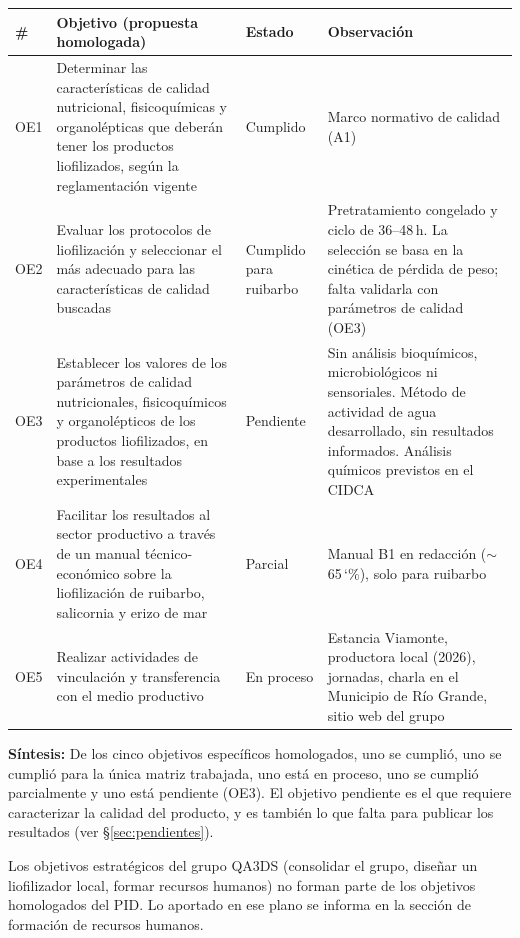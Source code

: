 \documentclass[12pt, a4paper]{article}
\newcommand{\pct}{\char`\%}
\begin{document}
\begin{longtable}{p{0.6cm}p{6cm}p{2cm}p{5cm}}
\toprule
\textbf{\#} & \textbf{Objetivo (propuesta homologada)} & \textbf{Estado} & \textbf{Observación} \\
\midrule
OE1 & Determinar las características de calidad nutricional, fisicoquímicas y organolépticas que deberán tener los productos liofilizados, según la reglamentación vigente & Cumplido & Marco normativo de calidad (A1) \\
OE2 & Evaluar los protocolos de liofilización y seleccionar el más adecuado para las características de calidad buscadas & Cumplido para ruibarbo & Pretratamiento congelado y ciclo de 36--48\,h. La selección se basa en la cinética de pérdida de peso; falta validarla con parámetros de calidad (OE3) \\
OE3 & Establecer los valores de los parámetros de calidad nutricionales, fisicoquímicos y organolépticos de los productos liofilizados, en base a los resultados experimentales & Pendiente & Sin análisis bioquímicos, microbiológicos ni sensoriales. Método de actividad de agua desarrollado, sin resultados informados. Análisis químicos previstos en el CIDCA \\
OE4 & Facilitar los resultados al sector productivo a través de un manual técnico-económico sobre la liofilización de ruibarbo, salicornia y erizo de mar & Parcial & Manual B1 en redacción ($\sim$65\,\pct{}), solo para ruibarbo \\
OE5 & Realizar actividades de vinculación y transferencia con el medio productivo & En proceso & Estancia Viamonte, productora local (2026), jornadas, charla en el Municipio de Río Grande, sitio web del grupo \\
\bottomrule
\end{longtable}

\textbf{Síntesis:} De los cinco objetivos específicos homologados, uno se cumplió, uno se cumplió para la única matriz trabajada, uno está en proceso, uno se cumplió parcialmente y uno está pendiente (OE3). El objetivo pendiente es el que requiere caracterizar la calidad del producto, y es también lo que falta para publicar los resultados (ver §\ref{sec:pendientes}).

Los objetivos estratégicos del grupo QA3DS (consolidar el grupo, diseñar un liofilizador local, formar recursos humanos) no forman parte de los objetivos homologados del PID. Lo aportado en ese plano se informa en la sección de formación de recursos humanos.

\end{document}

